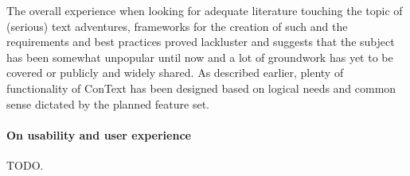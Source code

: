 The overall experience when looking for adequate literature touching the topic of (serious) text adventures, frameworks for the creation of such and the requirements and best practices proved lackluster and suggests that the subject has been somewhat unpopular until now and a lot of groundwork has yet to be covered or publicly and widely shared. As described earlier, plenty of functionality of ConText has been designed based on logical needs and common sense dictated by the planned feature set. 
\paragraph{On usability and user experience}
TODO.